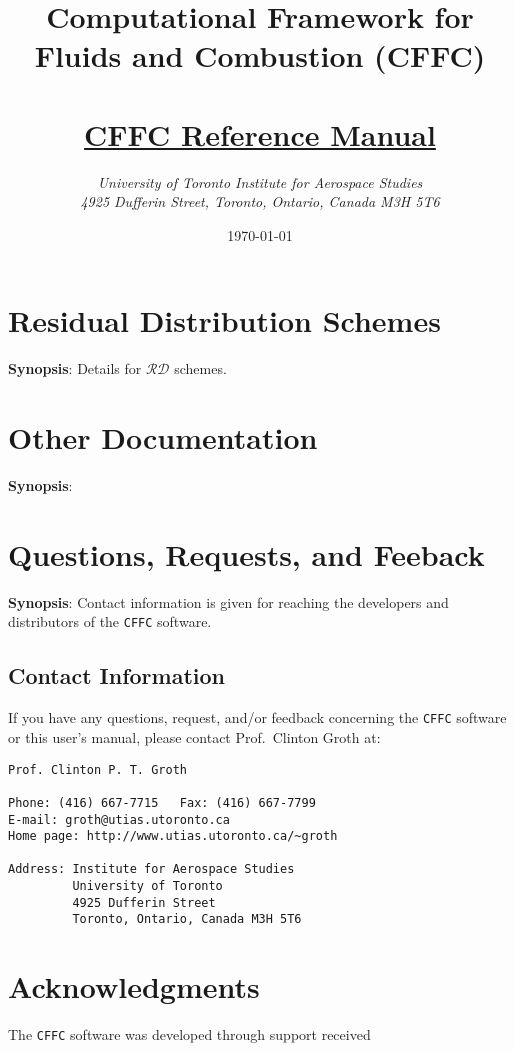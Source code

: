\documentclass[11pt]{report}
\title{\Large \bf
       Computational Framework for Fluids and Combustion (CFFC)\\
       \ \\ \Huge
       \protect\underline{CFFC Reference Manual}}
\author{\Large \em 
        University of Toronto Institute for Aerospace Studies\\
        \Large \em
        4925 Dufferin Street, Toronto, Ontario, Canada M3H 5T6}
\date{\today}
\begin{document}
\maketitle

\tableofcontents

\chapter{Residual Distribution Schemes}

\textbf{Synopsis}: Details for $\mathcal{RD}$ schemes.

\chapter{Other Documentation}

{\bf Synopsis}: 

\chapter{Questions, Requests, and Feeback}

{\bf Synopsis}: Contact information is given for reaching the
                developers and distributors of the 
                {\tt CFFC} software.

\section{Contact Information}

If you have any questions, request, and/or feedback concerning the 
{\tt CFFC} software or this user's manual,
please contact Prof.\ Clinton Groth at:
\begin{verbatim}
Prof. Clinton P. T. Groth

Phone: (416) 667-7715   Fax: (416) 667-7799
E-mail: groth@utias.utoronto.ca
Home page: http://www.utias.utoronto.ca/~groth

Address: Institute for Aerospace Studies
         University of Toronto
         4925 Dufferin Street
         Toronto, Ontario, Canada M3H 5T6
\end{verbatim}

\chapter{Acknowledgments}

The {\tt CFFC} software was developed through 
support received 
\end{document}
